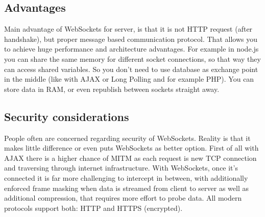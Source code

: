 \subsection{Advantages}

Main advantage of WebSockets for server, is that it is not HTTP request (after handshake), but proper message based communication protocol. That allows you to achieve huge performance and architecture advantages. For example in node.js you can share the same memory for different socket connections, so that way they can access shared variables. So you don't need to use database as exchange point in the middle (like with AJAX or Long Polling and for example PHP). You can store data in RAM, or even republish between sockets straight away.

\subsection{Security considerations}
People often are concerned regarding security of WebSockets. Reality is that it makes little difference or even puts WebSockets as better option. First of all with AJAX there is a higher chance of MITM as each request is new TCP connection and traversing through internet infrastructure. With WebSockets, once it's connected it is far more challenging to intercept in between, with additionally enforced frame masking when data is streamed from client to server as well as additional compression, that requires more effort to probe data. All modern protocols support both: HTTP and HTTPS (encrypted).

